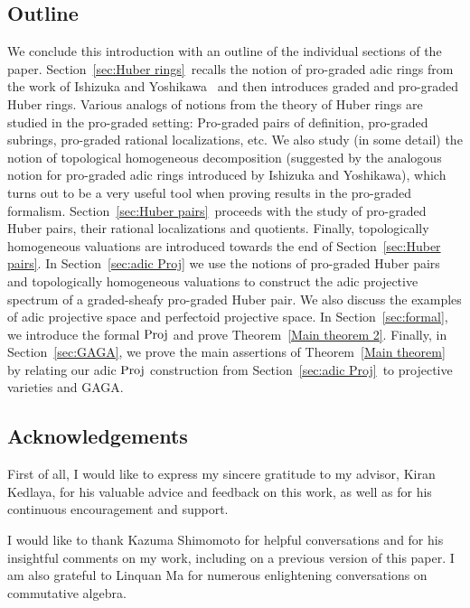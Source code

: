 \documentclass[12pt,twoside,a4paper]{article}
\theoremstyle{definition}
\theoremstyle{remark}
\newcommand\Proj{{\rm Proj}}
\begin{document}
\subsection{Outline}

We conclude this introduction with an outline of the individual sections of the paper. Section~\ref{sec:Huber rings} recalls the notion of pro-graded adic rings from the work of Ishizuka and Yoshikawa~\cite{Ishizuka-Yoshikawa25} and then introduces graded and pro-graded Huber rings. Various analogs of notions from the theory of Huber rings are studied in the pro-graded setting: Pro-graded pairs of definition, pro-graded subrings, pro-graded rational localizations, etc. We also study (in some detail) the notion of topological homogeneous decomposition (suggested by the analogous notion for pro-graded adic rings introduced by Ishizuka and Yoshikawa), which turns out to be a very useful tool when proving results in the pro-graded formalism. Section~\ref{sec:Huber pairs} proceeds with the study of pro-graded Huber pairs, their rational localizations and quotients. Finally, topologically homogeneous valuations are introduced towards the end of Section~\ref{sec:Huber pairs}. In Section~\ref{sec:adic Proj} we use the notions of pro-graded Huber pairs and topologically homogeneous valuations to construct the adic projective spectrum of a graded-sheafy pro-graded Huber pair. We also discuss the examples of adic projective space and perfectoid projective space. In Section~\ref{sec:formal}, we introduce the formal $\Proj$ and prove Theorem~\ref{Main theorem 2}. Finally, in Section~\ref{sec:GAGA}, we prove the main assertions of Theorem~\ref{Main theorem} by relating our adic $\Proj$ construction from Section~\ref{sec:adic Proj} to projective varieties and GAGA. 

\subsection{Acknowledgements}

First of all, I would like to express my sincere gratitude to my advisor, Kiran Kedlaya, for his valuable advice and feedback on this work, as well as for his continuous encouragement and support. 

I would like to thank Kazuma Shimomoto for helpful conversations and for his insightful comments on my work, including on a previous version of this paper. I am also grateful to Linquan Ma for numerous enlightening conversations on commutative algebra. 
\end{document}
